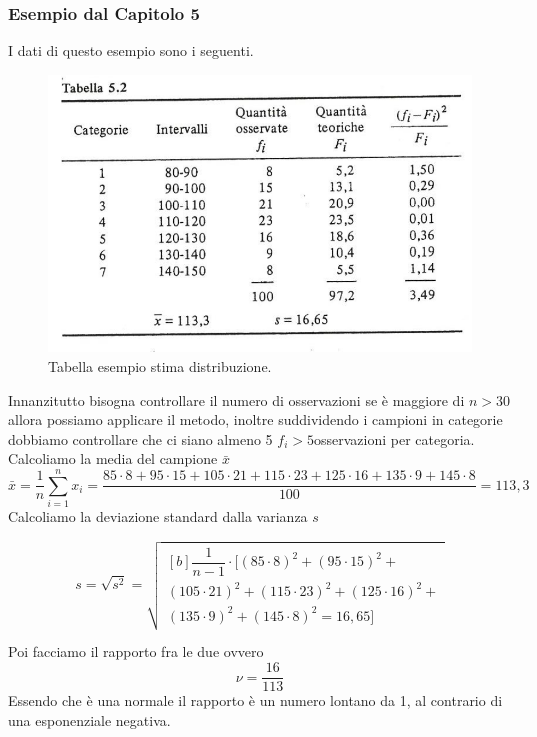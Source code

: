 \subsubsection{Esempio dal Capitolo 5}
I dati di questo esempio sono i seguenti.
\begin{figure}[H]
	\centering
    \includegraphics[width=15cm, keepaspectratio]{img/esercizio_good_fit.png}
	\caption{Tabella esempio stima distribuzione.}\label{fig:good_fit}
\end{figure}
Innanzitutto bisogna controllare il numero di osservazioni se è maggiore di $n>30$ allora possiamo applicare il metodo, inoltre suddividendo i campioni in categorie dobbiamo controllare che ci siano almeno 5 $f_i > 5$osservazioni per categoria.\\
Calcoliamo la media del campione $\bar{x}$
\[ \bar{x} = \dfrac{1}{n} \sum_{i=1}^{n} x_i = \dfrac{85\cdot8 + 95 \cdot 15 + 105 \cdot21 + 115 \cdot 23 +125 \cdot 16 + 135 \cdot9 + 145 \cdot8 }{100} = 113,3\]
Calcoliamo la deviazione standard dalla varianza $s$

\begin{equation*}
     s= \sqrt{s^2} = \sqrt{\begin{multlined}[b] 
     \dfrac{1}{n-1} \cdot [ (85\cdot8)^2 + (95 \cdot 15)^2 +\\
     (105 \cdot21)^2 +( 115 \cdot 23)^2 +(125 \cdot 16)^2 +\\
     (135 \cdot9)^2 + (145 \cdot8)^2 = 16,65]
     \end{multlined}}
\end{equation*}
    
Poi facciamo il rapporto fra le due ovvero
\[\nu = \frac{16}{113}\]
Essendo che è una normale il rapporto è un numero lontano da 1, al contrario di una esponenziale negativa.